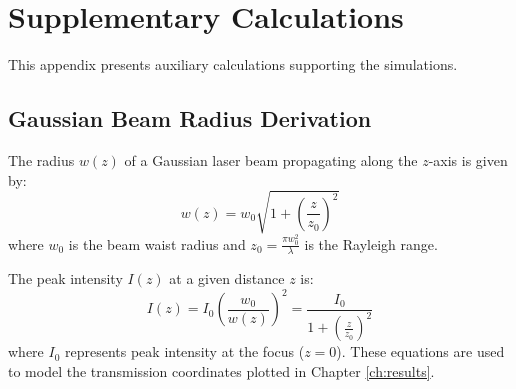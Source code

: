 \appendix
\chapter{Supplementary Calculations}
\label{app:calculations}

This appendix presents auxiliary calculations supporting the simulations.

\section{Gaussian Beam Radius Derivation}
The radius $w(z)$ of a Gaussian laser beam propagating along the $z$-axis is given by:
\begin{equation}
    w(z) = w_0 \sqrt{1 + \left(\frac{z}{z_0}\right)^2}
    \label{eq:beam_radius}
\end{equation}
where $w_0$ is the beam waist radius and $z_0 = \frac{\pi w_0^2}{\lambda}$ is the Rayleigh range.

The peak intensity $I(z)$ at a given distance $z$ is:
\begin{equation}
    I(z) = I_0 \left( \frac{w_0}{w(z)} \right)^2 = \frac{I_0}{1 + \left(\frac{z}{z_0}\right)^2}
    \label{eq:intensity_distribution}
\end{equation}
where $I_0$ represents peak intensity at the focus ($z=0$). These equations are used to model the transmission coordinates plotted in Chapter \ref{ch:results}.
